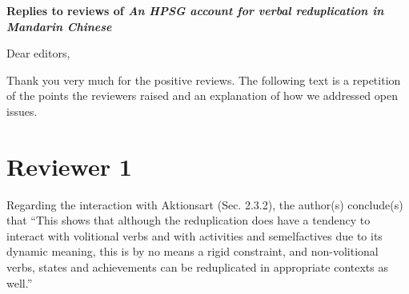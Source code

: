 \documentclass[fleqn,twoside]{article}
\begin{document}
\noindent
{\large\bf Replies to reviews of \emph{An HPSG account for verbal reduplication in Mandarin Chinese}}

Dear editors,

Thank you very much for the positive reviews. The following text is a repetition of the points the
reviewers raised and an explanation of how we addressed open issues.

\section{Reviewer 1}

Regarding the interaction with Aktionsart (Sec. 2.3.2), the author(s) conclude(s) that “This shows
that although the reduplication does have a tendency to interact with volitional verbs and with
activities and semelfactives due to its dynamic meaning, this is by no means a rigid constraint, and
non-volitional verbs, states and achievements can be reduplicated in appropriate contexts as well.” 
\end{document}
